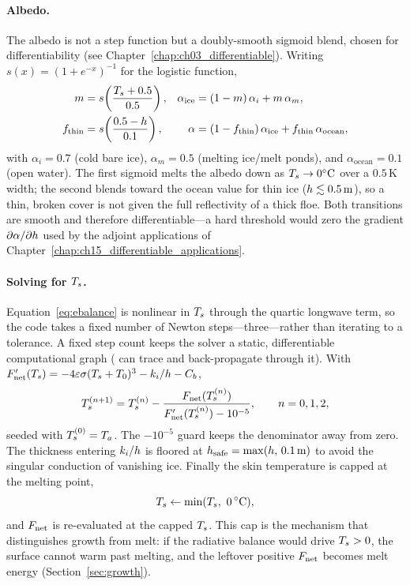 \paragraph{Albedo.} The albedo is not a step function but a doubly-smooth
sigmoid blend, chosen for differentiability (see
Chapter~\ref{chap:ch03_differentiable}). Writing
$s(x)=(1+e^{-x})^{-1}$ for the logistic function,
\begin{align}
  m  &= s\!\left(\frac{T_{s}+0.5}{0.5}\right),
      &\alpha_{\mathrm{ice}} &= (1-m)\,\alpha_{i} + m\,\alpha_{m}, \\
  f_{\mathrm{thin}} &= s\!\left(\frac{0.5-h}{0.1}\right),
      &\alpha &= (1-f_{\mathrm{thin}})\,\alpha_{\mathrm{ice}}
                 + f_{\mathrm{thin}}\,\alpha_{\mathrm{ocean}},
  \label{eq:albedo}
\end{align}
with $\alpha_i=0.7$ (cold bare ice), $\alpha_m=0.5$ (melting ice/melt ponds),
and $\alpha_{\mathrm{ocean}}=0.1$ (open water). The first sigmoid melts the
albedo down as $T_{s} \to 0^\circ\mathrm{C}$ over a $0.5\,\mathrm{K}$ width; the
second blends toward the ocean value for thin ice ($h \lesssim 0.5\,
\mathrm{m}$), so a thin, broken cover is not given the full reflectivity of a
thick floe. Both transitions are smooth and therefore differentiable---a hard
threshold would zero the gradient $\partial\alpha/\partial h$ used by the
adjoint applications of Chapter~\ref{chap:ch15_differentiable_applications}.

\paragraph{Solving for $T_{s}$.} Equation~\eqref{eq:ebalance} is nonlinear in
$T_{s}$ through the quartic longwave term, so the code takes a fixed number of
Newton steps---three---rather than iterating to a tolerance. A fixed step count
keeps the solver a static, differentiable computational graph (\jax{} can trace
and back-propagate through it). With
$F_{\mathrm{net}}'(T_{s}) = -4\varepsilon\sigma(T_{s}+T_0)^3 - k_{i}/h - C_b$,
\begin{equation}
  T_{s}^{(n+1)} = T_{s}^{(n)}
      - \frac{F_{\mathrm{net}}(T_{s}^{(n)})}{F_{\mathrm{net}}'(T_{s}^{(n)}) - 10^{-5}},
  \qquad n=0,1,2,
  \label{eq:newton}
\end{equation}
seeded with $T_{s}^{(0)}=T_a$. The $-10^{-5}$ guard keeps the denominator away
from zero. The thickness entering $k_{i}/h$ is floored at
$h_{\mathrm{safe}}=\max(h,\,0.1\,\mathrm{m})$ to avoid the singular
conduction of vanishing ice. Finally the skin temperature is capped at the
melting point,
\begin{equation}
  T_{s} \leftarrow \min(T_{s},\ 0\,^\circ\mathrm{C}),
  \label{eq:tcap}
\end{equation}
and $F_{\mathrm{net}}$ is re-evaluated at the capped $T_{s}$. This cap is the mechanism
that distinguishes growth from melt: if the radiative balance would drive
$T_{s}>0$, the surface cannot warm past melting, and the leftover positive
$F_{\mathrm{net}}$ becomes melt energy (Section~\ref{sec:growth}).

